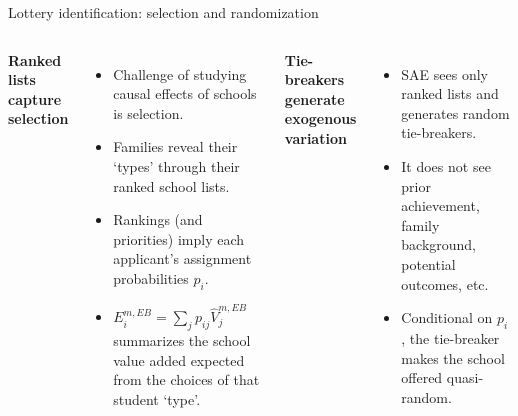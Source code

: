 \documentclass[11pt,aspectratio=169]{beamer}
\let\oldparencite\parencite
\renewcommand{\parencite}[2][]{%
  \footnotesize {\tiny \oldparencite[#1]{#2}} \normalsize%
}
\begin{document}
\begin{frame}{Lottery identification: selection and randomization}
\footnotesize
\begin{columns}[T,onlytextwidth]
  \textbf{Ranked lists capture selection}
  \begin{itemize}
    \item Challenge of studying causal effects of schools is selection.
    \item Families reveal their `types' through their ranked school lists.
    \item Rankings (and priorities) imply each applicant's assignment probabilities $p_i$.
    \item $E_i^{m,EB}=\sum_j p_{ij}\widehat V_j^{m,EB}$ summarizes the school value added expected from the choices of that student `type'.
  \end{itemize}

  \textbf{Tie-breakers generate exogenous variation}
  \begin{itemize}
    \item SAE sees only ranked lists and generates random tie-breakers.
    \item It does not see prior achievement, family background, potential outcomes, etc.
    \item Conditional on $p_i$, the tie-breaker makes the school offered quasi-random.
  \end{itemize}
\end{columns}


\end{frame}
\end{document}
